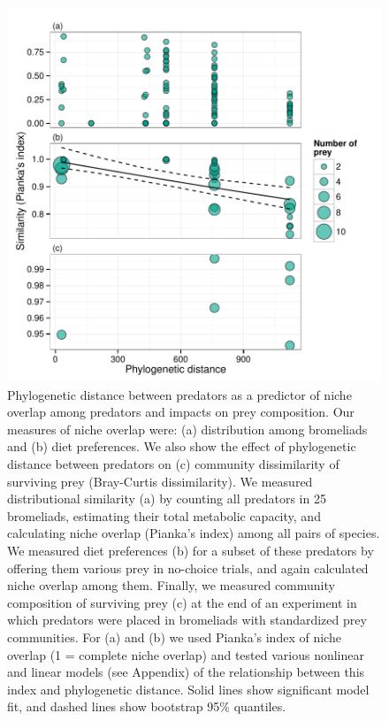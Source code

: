 \begin{figure}[htbp]
\centering
\includegraphics{figures/FIG_1.pdf}
\caption{Phylogenetic distance between predators as a
predictor of niche overlap among predators and impacts on prey
composition. Our measures of niche overlap were: (a) distribution among
bromeliads and (b) diet preferences. We also show the effect of
phylogenetic distance between predators on (c) community dissimilarity
of surviving prey (Bray-Curtis dissimilarity). We measured
distributional similarity (a) by counting all predators in 25
bromeliads, estimating their total metabolic capacity, and calculating
niche overlap (Pianka's index) among all pairs of species. We measured
diet preferences (b) for a subset of these predators by offering them
various prey in no-choice trials, and again calculated niche overlap
among them. Finally, we measured community composition of surviving prey
(c) at the end of an experiment in which predators were placed in
bromeliads with standardized prey communities. For (a) and (b) we used
Pianka's index of niche overlap (1 = complete niche overlap) and tested
various nonlinear and linear models (see Appendix) of the relationship
between this index and phylogenetic distance. Solid lines show
significant model fit, and dashed lines show bootstrap 95\% quantiles.}
\end{figure}



